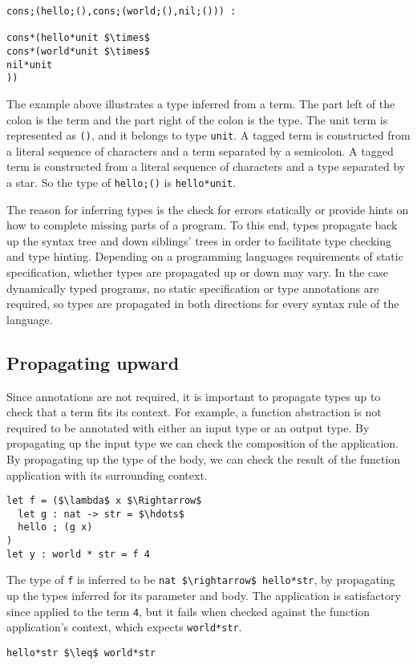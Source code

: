 \documentclass[sigplan,screen]{acmart}
\begin{document}
\begin{lstlisting}
cons;(hello;(),cons;(world;(),nil;())) : 

cons*(hello*unit $\times$ 
cons*(world*unit $\times$ 
nil*unit
))
\end{lstlisting}

\noindent The example above illustrates a type inferred from a term.
The part left of the colon is the term and the part right of the colon is the type.
The unit term is represented as \lstinline{()}, and it belongs to type \lstinline{unit}. 
A tagged term is constructed from a literal sequence of characters and a term separated
by a semicolon. A tagged term is constructed from a literal sequence of characters
and a type separated by a star.
So the type of \lstinline{hello;()} is \lstinline{hello*unit}.

The reason for inferring types is the check for errors statically or 
provide hints on how to complete missing parts of a program. To this end,
types propagate back up the syntax tree and down siblings' trees in order
to facilitate type checking and type hinting.
Depending on a programming languages requirements of static specification, 
whether types are propagated up or down may vary. 
In the case dynamically typed programs, no static specification or type annotations
are required, so types are propagated in both directions for every syntax rule
of the language.


\subsection{Propagating upward}
Since annotations are not required, it is important to propagate types up to check
that a term fits its context.
For example, a function abstraction is not required to be annotated 
with either an input type or an output type. 
\noindent By propagating up the input type we can check the composition of the application.
By propagating up the type of the body, we can check the result of the function application 
with its surrounding context. 

\begin{lstlisting}
let f = ($\lambda$ x $\Rightarrow$ 
  let g : nat -> str = $\hdots$
  hello ; (g x)
) 
let y : world * str = f 4
\end{lstlisting}

The type of \lstinline{f} is inferred to be \lstinline{nat $\rightarrow$ hello*str}, 
by propagating up the types inferred for its parameter and body.
The application is satisfactory since applied to the term \lstinline{4}, 
but it fails when checked against the function application's context,
which expects \lstinline{world*str}.
\begin{lstlisting}
hello*str $\leq$ world*str
\end{lstlisting}
\end{document}
